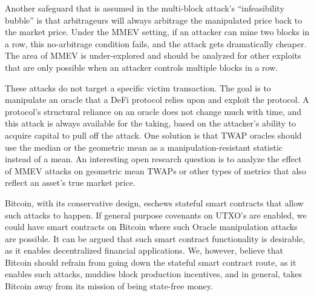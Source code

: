 Another safeguard that is assumed in the multi-block attack's ``infeasibility bubble'' is that arbitrageurs will always arbitrage the manipulated price back to the market price. Under the MMEV setting, if an attacker can mine two blocks in a row, this no-arbitrage condition fails, and the attack gets dramatically cheaper. The area of MMEV is under-explored and should be analyzed for other exploits that are only possible when an attacker controls multiple blocks in a row. 

These attacks do not target a specific victim transaction. The goal is to manipulate an oracle that a DeFi protocol relies upon and exploit the protocol. A protocol's structural reliance on an oracle does not change much with time, and this attack is always available for the taking, based on the attacker's ability to acquire capital to pull off the attack. One solution is that TWAP oracles should use the median or the geometric mean as a manipulation-resistant statistic instead of a mean. An interesting open research question is to analyze the effect of MMEV attacks on geometric mean TWAPs or other types of metrics that also reflect an asset's true market price.

Bitcoin, with its conservative design, eschews stateful smart contracts that allow such attacks to happen. If general purpose covenants on UTXO's are enabled, we could have smart contracts on Bitcoin where such Oracle manipulation attacks are possible. It can be argued that such smart contract functionality is desirable, as it enables decentralized financial applications. We, however, believe that Bitcoin should refrain from going down the stateful smart contract route, as it enables such attacks, muddies block production incentives, and in general, takes Bitcoin away from its mission of being state-free money.